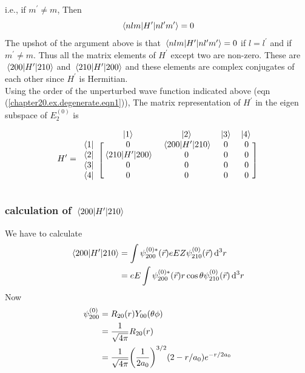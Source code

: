 	i.e., if $m^\prime \neq m$, Then
	\begin{equation*}
		\mel{n l m}{H^\prime}{n l^\prime m^\prime} = 0
	\end{equation*}
	The upshot of the argument above is that $\mel{n l m}{H^\prime}{n l^\prime m^\prime} = 0$ if $l=l^\prime$ and if $m^\prime \neq m$. Thus all the matrix elements of $H^\prime$ except two are non-zero. These are $\mel{2 0 0}{H^\prime}{2 1 0}$ and $\mel{2 1 0}{H^\prime}{2 0 0}$ and these elements are complex conjugates of each other since $H^\prime$ is Hermitian.\\
	
	Using the order of the unperturbed wave function indicated above (eqn (\ref{chapter20.ex.degenerate.eqn1})), The matrix representation of $H^\prime$ in the eigen subspace of $E_2^{(0)}$ is
	
	\begin{equation}
	H^\prime = 
	\begin{blockarray}{ccccc}
	\ & \ket{1} & \ket{2} & \ket{3} & \ket{4}  \\
	\begin{block}{c[cccc]}
	\bra{1} & 0 & \mel{2 0 0}{H^\prime}{2 1 0} & 0 & 0  \\
	\bra{2} & \mel{2 1 0}{H^\prime}{2 0 0} & 0 & 0 & 0  \\
	\bra{3} & 0 & 0 & 0 & 0  \\ 
	\bra{4} & 0 & 0 & 0 & 0 \\
	\end{block}
	\end{blockarray}
	\end{equation}
	
	
	
	
	\subsubsection{calculation of $\mel{2 0 0}{H^\prime}{2 1 0}$}
	We have to calculate
	\begin{align*}
		\mel{2 0 0}{H^\prime}{2 1 0} 
		&= \int \psi_{2 0 0}^{(0)*} \qty(\vec{r}) e E Z \psi_{2 1 0}^{(0)}\qty(\vec{r})  \dd[3]{r} \\
		&= e E \int \psi_{2 0 0}^{(0)*} \qty(\vec{r}) r \cos \theta \psi_{2 1 0}^{(0)}\qty(\vec{r})  \dd[3]{r}
	\end{align*}
	Now
	\begin{align*}
		\psi_{2 0 0}^{(0)} 
		&= R_{2 0}\qty(r) Y_{0 0}\qty(\theta \phi) \\
		&= \frac{1}{\sqrt{4 \pi}} R_{2 0}\qty(r) \\
		&= \frac{1}{\sqrt{4 \pi}} \qty(\frac{1}{2 a_0})^{3/2} \qty(2 - r/a_0) e^{-r/2 a_0}
	\end{align*}
	
